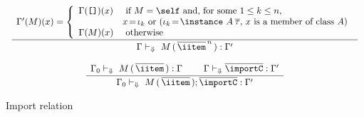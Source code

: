 \begin{figure}
\begin{mdframed}
\[ \begin{array}{cc}
	\displaystyle\frac
	 {\begin{array}{ll}
            \Gamma'(M)(x) = \left\{ \begin{array}{ll}
              \Gamma(\texttt{[]})(x) & \text{ if } M = \self \text{ and, for some $1 \leq k \leq n$, }\\
                                     & %
                                         x\hspace*{-.05cm} =\hspace*{-.05cm} \iota_k \text{ or 
                                         ($\iota_k\hspace*{-.05cm} =\hspace*{-.05cm} \instance\ A\: \overline{\tau}$, $x$ is a member of class $A$)}\\
               \Gamma(M)(x)          & \text{ otherwise}
             \end{array}\right.
          \end{array}}
	 {\Gamma \vdash_{\Downarrow} \ M\, (\,\overline{\iitem}^{\,n}\,) : \Gamma'}  \\\ \\

	\displaystyle\frac
	 {\begin{array}{ll}
	   \Gamma_0 \vdash_{\Downarrow} \ M\, (\,\overline{\iitem}\,) : \Gamma \:\:\: & \:\:\: 
           \Gamma \vdash_{\Downarrow} \overline{\importC} : \Gamma'
          \end{array}}
	 {\Gamma_0 \vdash_{\Downarrow} \ M\, (\,\overline{\iitem}\,); \overline{\importC} : \Gamma'} 
\end{array} \]
\end{mdframed} \vspace{-.2cm}
\caption{Import relation}
\label{fig:import-relation}
\end{figure}


